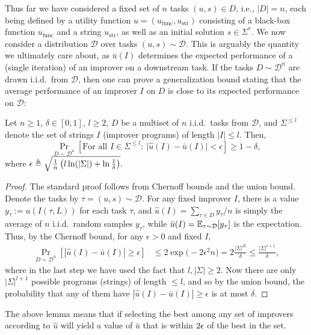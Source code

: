\documentclass{article} %
\newcommand{\metautil}{{\hat{u}}}
\newcommand{\exputil}{{\bar{u}}}
\newcommand{\sol}{{s}}
\newcommand{\D}{{\mathcal{D}}}
\newcommand{\defeq}{\triangleq}
\begin{document}
Thus far we have considered a fixed set of $n$ tasks $(u, \sol) \in D$, i.e., $|D|=n$, each being defined by a utility function $u=(u_\text{func}, u_\text{str})$ consisting of a black-box function $u_\text{func}$ and a string $u_\text{str}$, as well as an initial solution $\sol \in \Sigma^*$. We now consider a distribution $\D$ over tasks $(u, \sol) \sim \D$. 
This is arguably the quantity we ultimately care about, as $\exputil(I)$ determines the expected performance of a (single iteration) of an improver on a downstream task. 
If the tasks $D\sim \D^n$ are drawn i.i.d.\ from $\D$, then one can prove a generalization bound stating that the average performance of an improver $I$ on $D$ is close to its expected performance on $\D$:
\begin{lemma}
    Let $n \ge 1$, $\delta \in [0,1]$, $l \ge 2$, $D$ be a multiset of $n$ i.i.d.\ tasks from $\D$, and $\Sigma^{\le l}$ denote the set of strings $I$ (improver programs) of length $|I| \le l$. Then, 
    $$\Pr_{D\sim \D^n}\left[\text{For all } I \in \Sigma^{\le l}:~\bigl|\metautil(I) - \exputil(I)\bigr| < \epsilon\right] \ge 1-\delta,$$
    where $\eps \defeq \sqrt{\frac{1}{n}\left(l \ln(|\Sigma|) + \ln \frac{1}{\delta}\right)}.$
\end{lemma}
\begin{proof}
The standard proof follows from Chernoff bounds and the union bound. Denote the tasks by $\tau=(u, \sol)\sim \D$.  For any fixed improver $I$, there is a value $y_\tau:= u(I(\tau, L))$ for each task $\tau$, and $\metautil(I)=\sum_{\tau \in D}y_\tau/n$ is simply the average of $n$ i.i.d.\ random samples $y_\tau$, while $\exputil(I)=\E_{\tau \sim \D}[y_\tau]$ is the expectation. 
Thus, by the Chernoff bound, 
for any $\epsilon > 0$ and fixed $I$,
\begin{align*}
\Pr_{D\sim \D^n}\left[\left|\metautil(I) - \exputil(I)\right| \ge \epsilon\right] &\le 2\exp\bigl(-2\epsilon^2 n\bigr)
=2\frac{|\Sigma|^{2l}}{\delta}
\le \frac{|\Sigma|^{l+1}}{\delta},
\end{align*}
where in the last step we have used the fact that $l, |\Sigma| \ge 2$. Now there are only $|\Sigma|^{l+1}$ possible programs (strings) of length $\le l$, and so by the union bound, the probability that any of them have $|\metautil(I) - \exputil(I)| \ge \epsilon$ is at most $\delta$.
\end{proof}
The above lemma means that if selecting the best among any set of improvers according to $\metautil$ will yield a value of $\exputil$ that is within $2{\epsilon}$ of the best in the set.
\end{document}
